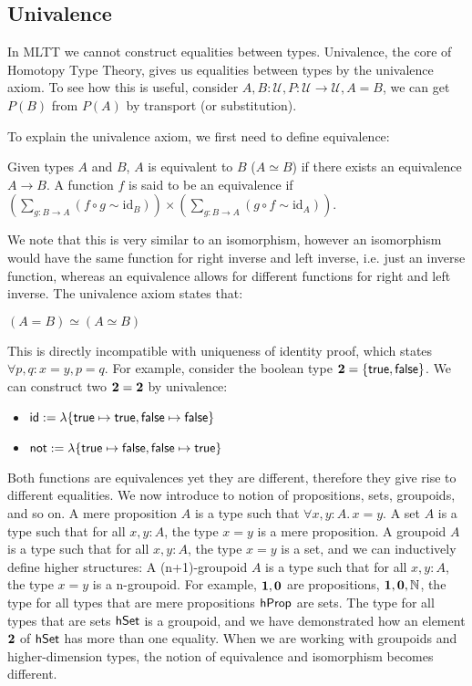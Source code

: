 \subsection{Univalence}\label{types:univalence}
In MLTT we cannot construct equalities between types. Univalence, the core of Homotopy Type Theory,
gives us equalities between types by the univalence axiom. To see how this is useful,
consider $A, B : \mathcal{U}, P : \mathcal{U} \rightarrow \mathcal{U}, A = B$, we can
get $P(B)$ from $P(A)$ by transport (or substitution).

To explain the univalence axiom, we first need to define equivalence:
\begin{definition}
    Given types $A$ and $B$, $A$ is equivalent to $B$ ($A \simeq B$) if there exists an
    equivalence $A \rightarrow B$.
    A function $f$ is said to be an equivalence if
    $\left( \sum_{g :B \rightarrow A} (f \circ g \sim \mathrm{id}_B) \right) \times \left( \sum_{g:B \rightarrow A} (g \circ f \sim \mathrm{id}_A) \right)$.
\end{definition}

We note that this is very similar to an isomorphism, however an isomorphism would have the same function
for right inverse and left inverse, i.e. just an inverse function, whereas an equivalence allows
for different functions for right and left inverse. The univalence axiom states that:
\begin{definition}
    $(A = B) \simeq (A \simeq B)$
\end{definition}

This is directly incompatible with uniqueness of identity proof, which states
$\forall p, q: x = y, p = q$. For example, consider the boolean type
${\mathbf{2}} = \{\operatorname{\mathsf{true}}, \operatorname{\mathsf{false}}\}$. We can construct two ${\mathbf{2}} = {\mathbf{2}}$
by univalence:
\begin{itemize}
    \item $\operatorname{\mathsf{id}} := \lambda \{ \operatorname{\mathsf{true}} \mapsto \operatorname{\mathsf{true}}, \operatorname{\mathsf{false}} \mapsto \operatorname{\mathsf{false}} \}$
    \item $\operatorname{\mathsf{not}} := \lambda \{ \operatorname{\mathsf{true}} \mapsto \operatorname{\mathsf{false}}, \operatorname{\mathsf{false}} \mapsto \operatorname{\mathsf{true}} \}$
\end{itemize}

Both functions are equivalences yet they are different, therefore they give rise to different equalities.
We now introduce to notion of propositions, sets, groupoids, and so on.
A mere proposition $A$ is a type such that $\forall x, y : A.\, x = y$.
A set $A$ is a type such that for all $x, y : A$, the type $x = y$ is a mere proposition.
A groupoid $A$ is a type such that for all $x, y : A$, the type $x = y$ is a set,
and we can inductively define higher structures:
A (n+1)-groupoid $A$ is a type such that for all $x, y : A$, the type $x = y$ is a n-groupoid.
For example, ${\mathbf{1}}, {\mathbf{0}}$ are propositions, ${\mathbf{1}}, {\mathbf{0}}, \mathbb{N}$,
the type for all types that are mere propositions $\mathsf{hProp}$ are sets.
The type for all types that are sets $\mathsf{hSet}$ is a groupoid, and we have demonstrated how an element ${\mathbf{2}}$
of $\mathsf{hSet}$ has more than one equality. When we are working with groupoids and higher-dimension
types, the notion of equivalence and isomorphism becomes different.

